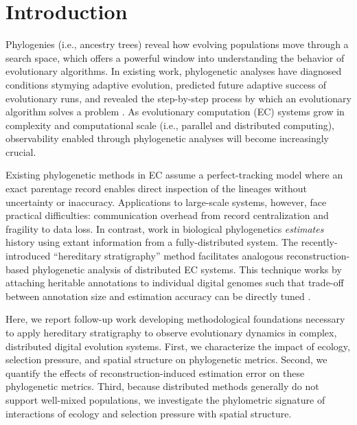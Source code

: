 \vspace{-1.5ex}
\section{Introduction}

Phylogenies (i.e., ancestry trees) reveal how evolving populations move through a search space, which offers a powerful window into understanding the behavior of evolutionary algorithms.
In existing work, phylogenetic analyses have diagnosed conditions stymying adaptive evolution, predicted future adaptive success of evolutionary runs, and revealed the step-by-step process by which an evolutionary algorithm solves a problem \citep{hernandezWhatCanPhylogenetic2022a,shahbandeganUntanglingPhylogeneticDiversity2022a,lalejiniEvolutionaryOriginsPhenotypic2016}.
As evolutionary computation (EC) systems grow in complexity and computational scale  (i.e., parallel and distributed computing), observability enabled through phylogenetic analyses will become increasingly crucial.

Existing phylogenetic methods in EC assume a perfect-tracking model where an exact parentage record enables direct inspection of the lineages without uncertainty or inaccuracy.
Applications to large-scale systems, however, face practical difficulties: communication overhead from record centralization and fragility to data loss.
In contrast, work in biological phylogenetics \textit{estimates} history using extant information from a fully-distributed system.
The recently-introduced ``hereditary stratigraphy'' method facilitates analogous reconstruction-based phylogenetic analysis of distributed EC systems.
This technique works by attaching heritable annotations to individual digital genomes such that trade-off between annotation size and estimation accuracy can be directly tuned \citep{moreno2022hereditary}.

Here, we report follow-up work developing methodological foundations necessary to apply hereditary stratigraphy to observe evolutionary dynamics in complex, distributed digital evolution systems.
First, we characterize the impact of ecology, selection pressure, and spatial structure on phylogenetic metrics.
Second, we quantify the effects of reconstruction-induced estimation error on these phylogenetic metrics.
Third, because distributed methods generally do not support well-mixed populations, we investigate the phylometric signature of interactions of ecology and selection pressure with spatial structure.

